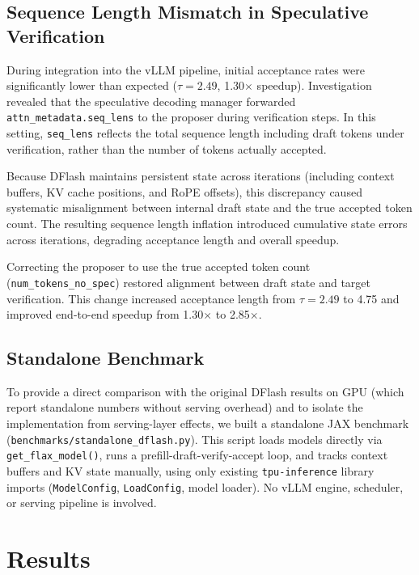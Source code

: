 \documentclass[12pt,letterpaper]{article}
\begin{document}
\subsection{Sequence Length Mismatch in Speculative Verification}

During integration into the vLLM pipeline, initial acceptance rates were significantly lower than expected ($\tau=2.49$, 1.30$\times$ speedup). Investigation revealed that the speculative decoding manager forwarded \texttt{attn\_metadata.seq\_lens} to the proposer during verification steps. In this setting, \texttt{seq\_lens} reflects the total sequence length including draft tokens under verification, rather than the number of tokens actually accepted.

Because DFlash maintains persistent state across iterations (including context buffers, KV cache positions, and RoPE offsets), this discrepancy caused systematic misalignment between internal draft state and the true accepted token count. The resulting sequence length inflation introduced cumulative state errors across iterations, degrading acceptance length and overall speedup.

Correcting the proposer to use the true accepted token count (\texttt{num\_tokens\_no\_spec}) restored alignment between draft state and target verification. This change increased acceptance length from $\tau=2.49$ to 4.75 and improved end-to-end speedup from 1.30$\times$ to 2.85$\times$.

\subsection{Standalone Benchmark}

To provide a direct comparison with the original DFlash results on GPU (which report standalone numbers without serving overhead) and to isolate the implementation from serving-layer effects, we built a standalone JAX benchmark (\texttt{benchmarks/standalone\_dflash.py}). This script loads models directly via \texttt{get\_flax\_model()}, runs a prefill-draft-verify-accept loop, and tracks context buffers and KV state manually, using only existing \texttt{tpu-inference} library imports (\texttt{ModelConfig}, \texttt{LoadConfig}, model loader). No vLLM engine, scheduler, or serving pipeline is involved.



\section{Results}
\end{document}
